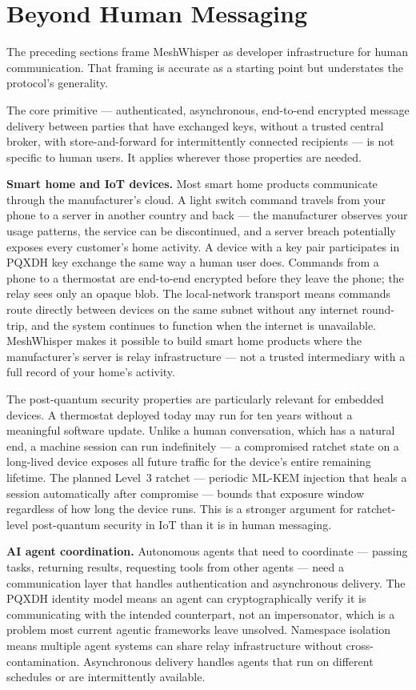 \documentclass[11pt, a4paper]{article}
\begin{document}
\section{Beyond Human Messaging}

The preceding sections frame MeshWhisper as developer infrastructure for human communication. That framing is accurate as a starting point but understates the protocol's generality.

The core primitive — authenticated, asynchronous, end-to-end encrypted message delivery between parties that have exchanged keys, without a trusted central broker, with store-and-forward for intermittently connected recipients — is not specific to human users. It applies wherever those properties are needed.

\textbf{Smart home and IoT devices.} Most smart home products communicate through the manufacturer's cloud. A light switch command travels from your phone to a server in another country and back — the manufacturer observes your usage patterns, the service can be discontinued, and a server breach potentially exposes every customer's home activity. A device with a key pair participates in PQXDH key exchange the same way a human user does. Commands from a phone to a thermostat are end-to-end encrypted before they leave the phone; the relay sees only an opaque blob. The local-network transport means commands route directly between devices on the same subnet without any internet round-trip, and the system continues to function when the internet is unavailable. MeshWhisper makes it possible to build smart home products where the manufacturer's server is relay infrastructure — not a trusted intermediary with a full record of your home's activity.

The post-quantum security properties are particularly relevant for embedded devices. A thermostat deployed today may run for ten years without a meaningful software update. Unlike a human conversation, which has a natural end, a machine session can run indefinitely — a compromised ratchet state on a long-lived device exposes all future traffic for the device's entire remaining lifetime. The planned Level~3 ratchet — periodic ML-KEM injection that heals a session automatically after compromise — bounds that exposure window regardless of how long the device runs. This is a stronger argument for ratchet-level post-quantum security in IoT than it is in human messaging.

\textbf{AI agent coordination.} Autonomous agents that need to coordinate — passing tasks, returning results, requesting tools from other agents — need a communication layer that handles authentication and asynchronous delivery. The PQXDH identity model means an agent can cryptographically verify it is communicating with the intended counterpart, not an impersonator, which is a problem most current agentic frameworks leave unsolved. Namespace isolation means multiple agent systems can share relay infrastructure without cross-contamination. Asynchronous delivery handles agents that run on different schedules or are intermittently available.
\end{document}
